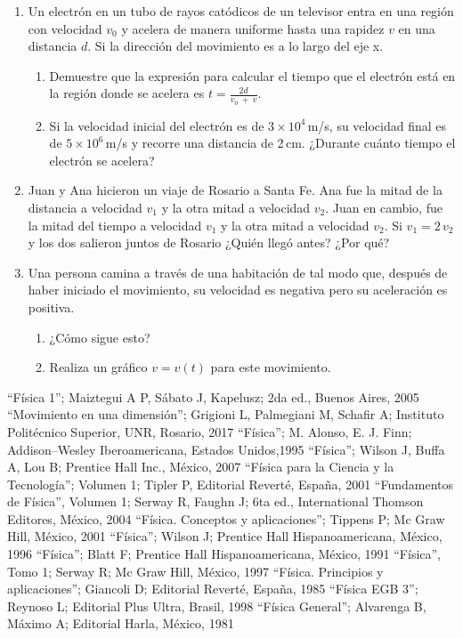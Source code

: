 \begin{enumerate}
  \item Un electrón en un tubo de rayos catódicos de un televisor entra en una región con velocidad $v_0$ y acelera de manera uniforme hasta una rapidez $v$ en una distancia $d$. Si la dirección del movimiento es a lo largo del eje x.
  \begin{enumerate}
    \item Demuestre que la expresión para calcular el tiempo que el electrón está en la región donde se acelera es $\displaystyle t =  \frac{2 d}{v_0 \ + \ v}$.
    \item Si la velocidad inicial del electrón es de $3 \times 10^4$\,m/s, su velocidad final es de $5 \times 10^6$\,m/s y recorre una distancia de 2\,cm. ¿Durante cuánto tiempo el electrón se acelera?
  \end{enumerate}

  \item Juan y Ana hicieron un viaje de Rosario a Santa Fe. Ana fue la mitad de la distancia a velocidad $v_1$ y la otra mitad a velocidad $v_2$. Juan en cambio, fue la mitad del tiempo a velocidad $v_1$ y la otra mitad a velocidad $v_2$. Si $v_1 =  2\,v_2$ y los dos salieron juntos de Rosario ¿Quién llegó antes? ¿Por qué?

  \item Una persona camina a través de una habitación de tal modo que, después de haber iniciado el movimiento, su velocidad es negativa pero su aceleración es positiva.
  \begin{enumerate}
    \item ¿Cómo sigue esto?
    \item Realiza un gráfico $v =  v(t)$ para este movimiento.
  \end{enumerate}
\end{enumerate}


\begin{thebibliography}{99}
 {``Física 1''; Maiztegui A P, Sábato J, Kapelusz; 2da ed., Buenos Aires, 2005}
 {``Movimiento en una dimensión''; Grigioni L, Palmegiani M, Schafir A; Instituto Politécnico Superior, UNR, Rosario, 2017}
   {``Física''; M. Alonso, E. J. Finn; Addison--Wesley Iberoamericana, Estados Unidos,1995}
   {``Física''; Wilson J, Buffa A, Lou B; Prentice Hall Inc., México, 2007}
   {``Física para la Ciencia y la Tecnología''; Volumen 1; Tipler P, Editorial Reverté, España, 2001}
   {``Fundamentos de Física'', Volumen 1; Serway R, Faughn J; 6ta ed., International Thomson Editores, México, 2004}
   {``Física. Conceptos y aplicaciones''; Tippens P; Mc Graw Hill, México, 2001}
   {``Física''; Wilson J; Prentice Hall Hispanoamericana, México, 1996}
   {``Física''; Blatt F; Prentice Hall Hispanoamericana, México, 1991}
   {``Física'', Tomo 1; Serway R; Mc Graw Hill, México, 1997}
   {``Física. Principios y aplicaciones''; Giancoli D; Editorial Reverté, España, 1985}
   {``Física EGB 3''; Reynoso L; Editorial Plus Ultra, Brasil, 1998}
   {``Física General''; Alvarenga B,  Máximo A; Editorial Harla, México, 1981}
  \end{thebibliography}
  \thispagestyle{empty}


%
